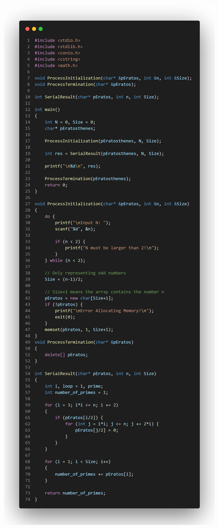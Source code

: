 \documentclass[12pt,a4paper]{report}
\begin{document}
\begin{center}
\clearpage
	\includegraphics[trim=0in 1.5in 0in 16.5in, clip, scale=0.35]{./Photos/Primes/Serial.PNG}
\end{center}
\end{document}
